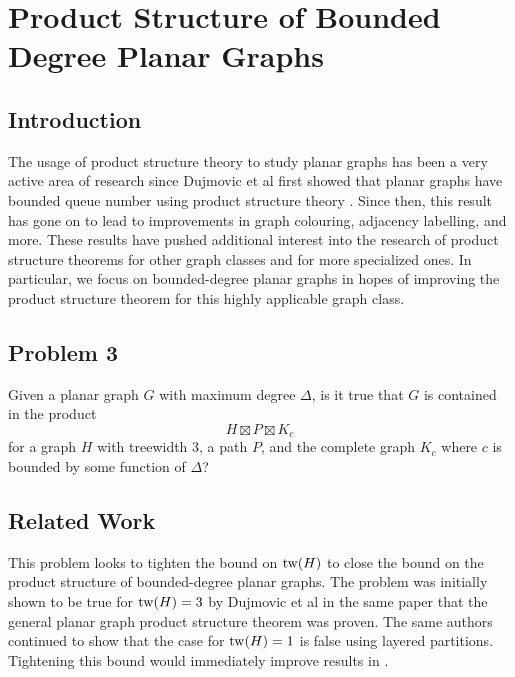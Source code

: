 \documentclass[../main.tex]{subfiles}
\begin{document}
	
	\section{Product Structure of Bounded Degree Planar Graphs}
	\subsection{Introduction}
	The usage of product structure theory to study planar graphs has been a very active area of research since Dujmovic et al first showed that planar graphs have bounded queue number using product structure theory \cite{}. Since then, this result has gone on to lead to improvements in graph colouring\cite{}, adjacency labelling\cite{}, and more. These results have pushed additional interest into the research of product structure theorems for other graph classes and for more specialized ones. In particular, we focus on bounded-degree planar graphs in hopes of improving the product structure theorem for this highly applicable graph class.  
	\subsection{Problem 3}
	Given a planar graph $G$ with maximum degree $\Delta$, is it true that $G$ is contained in the product $$H\boxtimes P\boxtimes K_c$$ for a graph $H$ with treewidth 3, a path $P$, and the complete graph $K_c$ where $c$ is bounded by some function of $\Delta$?
	
	\subsection{Related Work}
	This problem looks to tighten the bound on $\operatorname{tw}(H)$ to close the bound on the product structure of bounded-degree planar graphs. The problem was initially shown to be true for $\operatorname{tw}(H)=3$ by Dujmovic et al in the same paper that the general planar graph product structure theorem was proven\cite{}. The same authors continued to show that the case for $\operatorname{tw}(H)=1$ is false using layered partitions\cite{}. Tightening this bound would immediately improve results in \cite{}.
	
	
	
	
\end{document}
